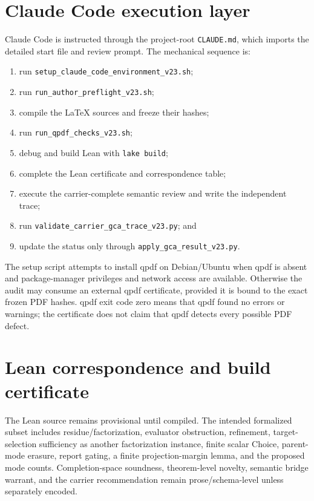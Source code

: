 \documentclass[10pt]{article}
\begin{document}
\section{Claude Code execution layer}

Claude Code is instructed through the project-root \texttt{CLAUDE.md}, which imports the detailed start file and review prompt.  The mechanical sequence is:
\begin{enumerate}
  \item run \texttt{setup\_claude\_code\_environment\_v23.sh};
  \item run \texttt{run\_author\_preflight\_v23.sh};
  \item compile the LaTeX sources and freeze their hashes;
  \item run \texttt{run\_qpdf\_checks\_v23.sh};
  \item debug and build Lean with \texttt{lake build};
  \item complete the Lean certificate and correspondence table;
  \item execute the carrier-complete semantic review and write the independent trace;
  \item run \texttt{validate\_carrier\_gca\_trace\_v23.py}; and
  \item update the status only through \texttt{apply\_gca\_result\_v23.py}.
\end{enumerate}

The setup script attempts to install qpdf on Debian/Ubuntu when qpdf is absent and package-manager privileges and network access are available.  Otherwise the audit may consume an external qpdf certificate, provided it is bound to the exact frozen PDF hashes.  qpdf exit code zero means that qpdf found no errors or warnings; the certificate does not claim that qpdf detects every possible PDF defect.

\section{Lean correspondence and build certificate}

The Lean source remains provisional until compiled.  The intended formalized subset includes residue/factorization, evaluator obstruction, refinement, target-selection sufficiency as another factorization instance, finite scalar Choice, parent-mode erasure, report gating, a finite projection-margin lemma, and the proposed mode counts.  Completion-space soundness, theorem-level novelty, semantic bridge warrant, and the carrier recommendation remain prose/schema-level unless separately encoded.
\end{document}
